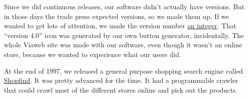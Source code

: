 Since we did continuous releases, our software didn't actually have
versions. But in those days the trade press expected versions, so we
made them up. If we wanted to get lots of attention, we made the version
number \href{http://www.ycombinator.com/viaweb/rel4.html}{an integer}.
That ``version 4.0'' icon was generated by our own button generator,
incidentally. The whole Viaweb site was made with our software, even
though it wasn't an online store, because we wanted to experience what
our users did.

At the end of 1997, we released a general purpose shopping search engine
called \href{http://ycombinator.com/viaweb/shoprel.html}{Shopfind}. It
was pretty advanced for the time. It had a programmable crawler that
could crawl most of the different stores online and pick out the
products.
